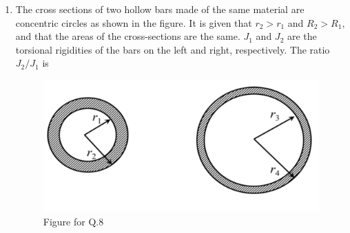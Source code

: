 \documentclass[journal,11pt,onecolumn]{IEEEtran}
\begin{document}
\begin{enumerate}
          \begin{enumerate}


          \end{enumerate}

    \item The cross sections of two hollow bars made of the same material are concentric circles as shown in the figure. It is given that $r_2 > r_1$ and $R_2 > R_1$, and that the areas of the cross-sections are the same. $J_1$ and $J_2$ are the torsional rigidities of the bars on the left and right, respectively. The ratio $J_2/J_1$ is

          \begin{figure}[H]
              \centering
              \includegraphics[scale=0.3]{q8}
              \caption{Figure for Q.8}
              \label{q8}
          \end{figure}

          \begin{enumerate}

\end{enumerate}
\end{enumerate}
\end{document}
